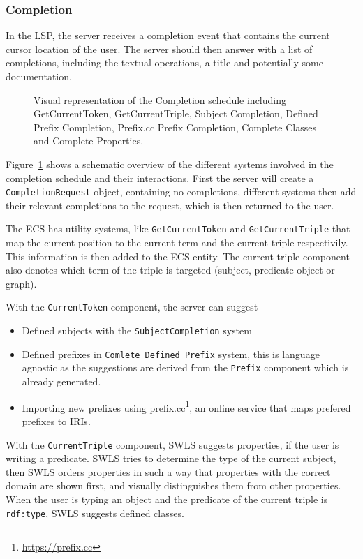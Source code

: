 \subsubsection{Completion}

In the LSP, the server receives a completion event that contains the current cursor location of the user.
The server should then answer with a list of completions, including the textual operations, a title and potentially some documentation.

\begin{figure}[!ht]
 \centering
  \caption{Visual representation of the Completion schedule including GetCurrentToken, GetCurrentTriple, Subject Completion, Defined Prefix Completion, Prefix.cc Prefix Completion, Complete Classes and Complete Properties.}\label{fig:Completion}
\end{figure}

Figure~\ref{fig:Completion} shows a schematic overview of the different systems involved in the completion schedule and their interactions.
First the server will create a \texttt{CompletionRequest} object, containing no completions,
different systems then add their relevant completions to the request, which is then returned to the user.

The ECS has utility systems, like \texttt{GetCurrentToken} and \texttt{GetCurrentTriple} that map the current position to the current term and the current triple respectivily. This information is then added to the ECS entity. The current triple component also denotes which term of the triple is targeted (subject, predicate object or graph).

With the \texttt{CurrentToken} component, the server can suggest
\begin{itemize}
  \item Defined subjects with the \texttt{SubjectCompletion} system
  \item Defined prefixes in \texttt{Comlete Defined Prefix} system, this is language agnostic as the suggestions are derived from the \texttt{Prefix} component which is already generated.
  \item Importing new prefixes using prefix.cc\footnote{\url{https://prefix.cc}}, an online service that maps prefered prefixes to IRIs.
\end{itemize}

With the \texttt{CurrentTriple} component, SWLS suggests properties, if the user is writing a predicate.
SWLS tries to determine the type of the current subject, then SWLS orders properties in such a way that properties with the correct domain are shown first,
and visually distinguishes them from other properties.
When the user is typing an object and the predicate of the current triple is \texttt{rdf:type}, SWLS suggests defined classes.


